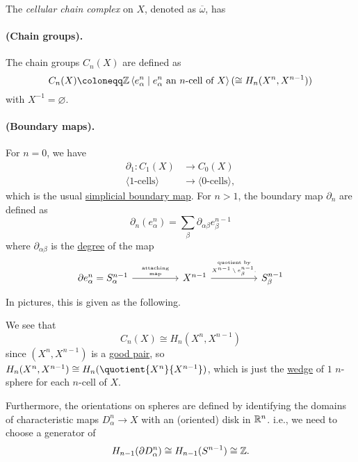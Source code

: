 \begin{definition}\label{def:cellular-chain-complex}
	The \emph{cellular chain complex} on \(X\), denoted as \(\overline{\omega}\), has
	\paragraph{(Chain groups).} The chain groups \(C_{n} (X)\) are defined as
	\[
		C_{n} (X) \coloneqq \mathbb{\MakeUppercase{z}} \left< e^n_\alpha \mid e^n_\alpha \text{ an \(n\)-cell of \(X\)}\right> (\cong H_n(X^n, X^{n-1}))
	\]
	with \(X^{-1} = \varnothing\).

	\paragraph{(Boundary maps).} For \(n=0\), we have
	\[
		\begin{split}
			\partial _1 \colon C_1(X)            & \to C_0(X)                       \\
			\langle \text{1-cells} \rangle & \to \langle \text{0-cells} \rangle,
		\end{split}
	\]
	which is the usual \hyperref[def:boundary-homomorphism]{simplicial boundary map}. For \(n > 1\), the boundary map \(\partial _{n}\) are defined as
	\[
		\partial _n(e_\alpha^n) = \sum_\beta \partial _{\alpha\beta} e_\beta^{n - 1}
	\]
	where \(\partial _{\alpha\beta}\) is the \hyperref[def:degree]{degree} of the map
	\[
		\begin{tikzcd}
			{\partial e^n_\alpha=S^{n-1}_{\alpha}} && {X^{n-1}} && {S^{n-1}_\beta}
			\arrow["{\text{attaching}\atop \text{map}}", from=1-1, to=1-3]
			\arrow["{\text{quotient by}\atop \text{\(X^{n-1} \setminus e^{n-1}_\beta\)}.}", from=1-3, to=1-5]
		\end{tikzcd}
	\]
	In pictures, this is given as the following.
	\begin{figure}[H]
		\centering
		\label{fig:cellular-boundary-map}
	\end{figure}
\end{definition}
\begin{remark}
	We see that
	\[
		C_{n} (X) \cong H_{n} (X^n, X^{n-1})
	\]
	since \((X^n, X^{n-1})\) is a \hyperref[def:good-pair]{good pair}, so \(H_{n} (X^n, X^{n-1}) \cong H_n(\quotient{X^n}{X^{n-1}})\), which is
	just the \hyperref[sssec:Wedge-sum]{wedge} of \(1\) \(n\)-sphere for each \(n\)-cell of \(X\).

	Furthermore, the orientations on spheres are defined by identifying the domains of characteristic maps 	\(D^n_\alpha \to X\) with an (oriented) disk in
	\(\mathbb{\MakeUppercase{r}} ^n\). i.e., we need to choose a generator of
	\[
		H_{n-1}(\partial D^n_\alpha) \cong H_{n-1}(S^{n-1})\cong \mathbb{\MakeUppercase{z}}.
	\]
\end{remark}


